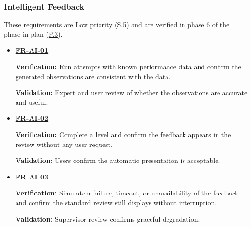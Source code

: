 \documentclass[12pt]{article}
\begin{document}
\subsubsection{Intelligent Feedback}
These requirements are Low priority (\hyperref[s5]{S.5}) and are verified in
phase 6 of the phase-in plan (\hyperref[p3]{P.3}).
\begin{itemize}
\item \hyperlink{req:FR-AI-01}{\textbf{FR-AI-01}}\par
 \textbf{Verification:} Run attempts with known performance data and
 confirm the generated observations are consistent with the data.\par
 \textbf{Validation:} Expert and user review of whether the observations are
 accurate and useful.
\item \hyperlink{req:FR-AI-02}{\textbf{FR-AI-02}}\par
 \textbf{Verification:} Complete a level and confirm the feedback appears in
 the review without any user request.\par
 \textbf{Validation:} Users confirm the automatic presentation is acceptable.
\item \hyperlink{req:FR-AI-03}{\textbf{FR-AI-03}}\par
 \textbf{Verification:} Simulate a failure, timeout, or unavailability of the
 feedback and confirm the standard review still displays without interruption.\par
 \textbf{Validation:} Supervisor review confirms graceful degradation.
\end{itemize}
\end{document}
